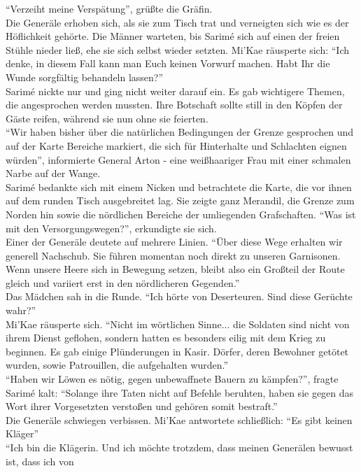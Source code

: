 ``Verzeiht meine Verspätung'', grüßte die Gräfin.\\
Die Generäle erhoben sich, als sie zum Tisch trat und verneigten sich wie es der Höflichkeit 
gehörte. Die Männer warteten, bis Sarimé sich auf einen der freien Stühle nieder ließ, ehe sie sich 
selbst wieder setzten. Mi'Kae räusperte sich: ``Ich denke, in diesem Fall kann man Euch keinen 
Vorwurf machen. Habt Ihr die Wunde sorgfältig behandeln lassen?''\\
Sarimé nickte nur und ging nicht weiter darauf ein. Es gab wichtigere Themen, die angesprochen 
werden mussten. Ihre Botschaft sollte still in den Köpfen der Gäste reifen, während sie nun ohne 
sie feierten.\\
``Wir haben bisher über die natürlichen Bedingungen der Grenze gesprochen und auf der Karte 
Bereiche markiert, die sich für Hinterhalte und Schlachten eignen würden'', informierte General 
Arton - eine weißhaariger Frau mit einer schmalen Narbe auf der Wange.\\
Sarimé bedankte sich mit einem Nicken und betrachtete die Karte, die vor ihnen auf dem runden Tisch 
ausgebreitet lag. Sie zeigte ganz Merandil, die Grenze zum Norden hin sowie die nördlichen Bereiche 
der umliegenden Grafschaften. ``Was ist mit den Versorgungswegen?'', erkundigte sie sich.\\
Einer der Generäle deutete auf mehrere Linien. ``Über diese Wege erhalten wir generell Nachschub. 
Sie führen momentan noch direkt zu unseren Garnisonen. Wenn unsere Heere sich in Bewegung setzen, 
bleibt also ein Großteil der Route gleich und variiert erst in den nördlicheren Gegenden.''\\
Das Mädchen sah in die Runde. ``Ich hörte von Deserteuren. Sind diese Gerüchte wahr?''\\
Mi'Kae räusperte sich. ``Nicht im wörtlichen Sinne... die Soldaten sind nicht von ihrem Dienst 
geflohen, sondern hatten es besonders eilig mit dem Krieg zu beginnen. Es gab einige Plünderungen 
in Kasir. Dörfer, deren Bewohner getötet wurden, sowie Patrouillen, die aufgehalten wurden.''\\
``Haben wir Löwen es nötig, gegen unbewaffnete Bauern zu kämpfen?'', fragte Sarimé kalt: ``Solange 
ihre Taten nicht auf Befehle beruhten, haben sie gegen das Wort ihrer Vorgesetzten verstoßen und 
gehören somit bestraft.''\\
Die Generäle schwiegen verbissen. Mi'Kae antwortete schließlich: ``Es gibt keinen Kläger''\\
``Ich bin die Klägerin. Und ich möchte trotzdem, dass meinen Generälen bewusst ist, dass ich von 
